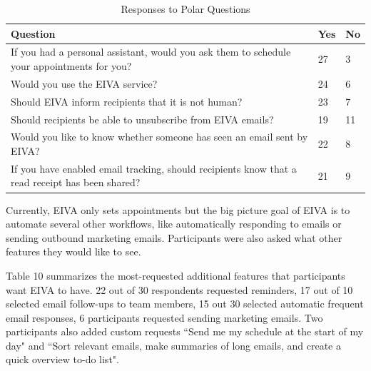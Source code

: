 \documentclass{article}
\begin{document}
\begin{table}[!htb]
	\begin{minipage}{1\linewidth}
		\caption{Responses to Polar Questions}
		\centering
		\begin{tabular}{p{9cm}p{0.75cm}p{0.75cm}}
			\hline
			\textbf{Question}                                                                               & \textbf{Yes} & \textbf{No} \\
			\hline
			If you had a personal assistant, would you ask them to schedule your appointments for you?      & 27           & 3           \\
			Would you use the EIVA service?                                                                 & 24           & 6           \\
			Should EIVA inform recipients that it is not human?                                             & 23           & 7           \\
			Should recipients be able to unsubscribe from EIVA emails?                                      & 19           & 11          \\
			Would you like to know whether someone has seen an email sent by EIVA?                          & 22           & 8           \\
			If you have enabled email tracking, should recipients know that a read receipt has been shared? & 21           & 9           \\
			\hline
		\end{tabular}
	\end{minipage}%
\end{table}

Currently, EIVA only sets appointments but the big picture goal of EIVA is to automate several other workflows, like automatically responding to emails or sending outbound marketing emails. Participants were also asked what other features they would like to see.

Table 10 summarizes the most-requested additional features that participants want EIVA to have. 22 out of 30 respondents requested reminders, 17 out of 10 selected email follow-ups to team members, 15 out 30 selected automatic frequent email responses, 6 participants requested sending marketing emails. Two participants also added custom requests ``Send me my schedule at the start of my day" and ``Sort relevant emails, make summaries of long emails, and create a quick overview to-do list".
\end{document}
